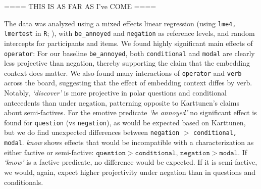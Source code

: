 \documentclass[12pt, a4paper]{article}
\begin{document}
==== THIS IS AS FAR AS I've COME ====


	\noindent The data was analyzed using a mixed effects linear regression (using \texttt{lme4, lmertest} in \texttt{R}; \citealp{bates_fitting_2015,kuznetsova_lmertest_2016,r_core_team_r_2014}), with \texttt{be\_annoyed} and \texttt{negation} as reference levels, and random intercepts for participants and items.
	We found highly significant main effects of \texttt{operator}: For our baseline \texttt{be\_annoyed}, both \texttt{conditional} and \texttt{modal} are clearly less projective than negation, thereby supporting the claim that the embedding context does matter. We also found many interactions of \texttt{operator} and \texttt{verb} across the board, suggesting that the effect of embedding context diffes by verb. Notably, \emph{\lq discover\rq} is more projective in polar questions and conditional antecedents than under negation, patterning opposite to Karttunen's claims about semi-factives. For the emotive predicate \emph{\lq be annoyed\rq} no significant effect is found for \texttt{question} (vs \texttt{negation}), as would be expected based on Karttunen, but we do find unexpected differences between \texttt{negation} $>$ \texttt{conditional, modal}. \emph{know} shows effects that would be incompatible with a characterization as either factive or semi-factive: $\texttt{question} > \texttt{conditional, negation} > \texttt{modal}$. If \emph{\lq know\rq} is a factive predicate, no difference would be expected. If it is semi-factive, we would, again, expect higher projectivity under negation than in questions and conditionals.
	
\end{document}
